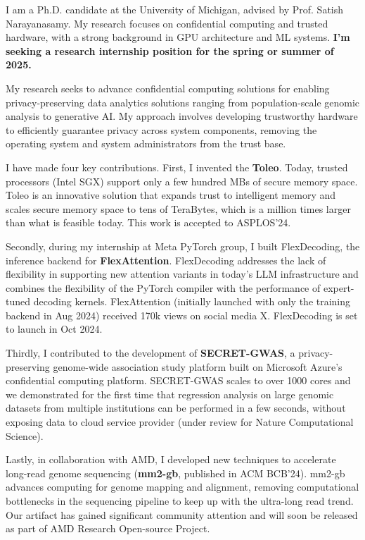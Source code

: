 I am a Ph.D. candidate at the University of Michigan, advised by Prof. Satish Narayanasamy. My research focuses on confidential computing and trusted hardware, with a strong background in GPU architecture and ML systems. \textbf{I'm seeking a research internship position for the spring or summer of 2025. }\par
My research seeks to advance confidential computing solutions for enabling privacy-preserving data analytics solutions ranging from population-scale genomic analysis to generative AI. My approach involves developing trustworthy hardware to efficiently guarantee privacy across system components, removing the operating system and system administrators from the trust base. \par


I have made four key contributions. First, I invented the \textbf{Toleo}. Today, trusted processors (Intel SGX) support only a few hundred MBs of secure memory space. Toleo is an innovative solution that expands trust to intelligent memory and scales secure memory space to tens of TeraBytes, which is a million times larger than what is feasible today. This work is accepted to ASPLOS'24. \par


Secondly, during my internship at Meta PyTorch group, I built FlexDecoding, the inference backend for \textbf{FlexAttention}. FlexDecoding addresses the lack of flexibility in supporting new attention variants in today's LLM infrastructure and combines the flexibility of the PyTorch compiler with the performance of expert-tuned decoding kernels. FlexAttention (initially launched with only the training backend in Aug 2024) received 170k views on social media X. FlexDecoding is set to launch in Oct 2024. \par


Thirdly, I contributed to the development of \textbf{SECRET-GWAS}, a privacy-preserving genome-wide association study platform built on Microsoft Azure's confidential computing platform.  SECRET-GWAS scales to over 1000 cores and we demonstrated for the first time that regression analysis on large genomic datasets from multiple institutions can be performed in a few seconds, without exposing data to cloud service provider (under review for Nature Computational Science).\par

Lastly, in collaboration with AMD, I developed new techniques to accelerate long-read genome sequencing (\textbf{mm2-gb}, published in ACM BCB'24). mm2-gb advances computing for genome mapping and alignment, removing computational bottlenecks in the sequencing pipeline to keep up with the ultra-long read trend. Our artifact has gained significant community attention and will soon be released as part of AMD Research Open-source Project. \par


